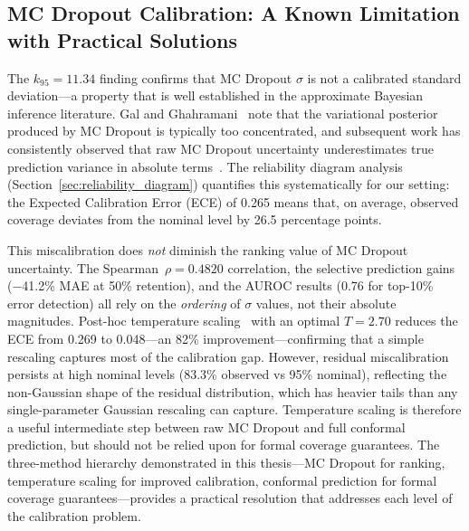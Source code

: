 \subsection{MC Dropout Calibration: A Known Limitation with Practical Solutions}

The $k_{95} = 11.34$ finding confirms that MC Dropout $\sigma$ is not a calibrated standard deviation---a property that is well established in the approximate Bayesian inference literature. Gal and Ghahramani~\cite{gal2016dropout} note that the variational posterior produced by MC Dropout is typically too concentrated, and subsequent work has consistently observed that raw MC Dropout uncertainty underestimates true prediction variance in absolute terms~\cite{laves2020well}. The reliability diagram analysis (Section~\ref{sec:reliability_diagram}) quantifies this systematically for our setting: the Expected Calibration Error (ECE) of 0.265 means that, on average, observed coverage deviates from the nominal level by 26.5 percentage points.

This miscalibration does \emph{not} diminish the ranking value of MC Dropout uncertainty. The Spearman~$\rho = 0.4820$ correlation, the selective prediction gains ($-$41.2\% MAE at 50\% retention), and the AUROC results (0.76 for top-10\% error detection) all rely on the \emph{ordering} of $\sigma$ values, not their absolute magnitudes. Post-hoc temperature scaling~\cite{guo2017calibration, laves2020well} with an optimal $T = 2.70$ reduces the ECE from 0.269 to 0.048---an 82\% improvement---confirming that a simple rescaling captures most of the calibration gap. However, residual miscalibration persists at high nominal levels (83.3\% observed vs 95\% nominal), reflecting the non-Gaussian shape of the residual distribution, which has heavier tails than any single-parameter Gaussian rescaling can capture. Temperature scaling is therefore a useful intermediate step between raw MC Dropout and full conformal prediction, but should not be relied upon for formal coverage guarantees. The three-method hierarchy demonstrated in this thesis---MC Dropout for ranking, temperature scaling for improved calibration, conformal prediction for formal coverage guarantees---provides a practical resolution that addresses each level of the calibration problem.

